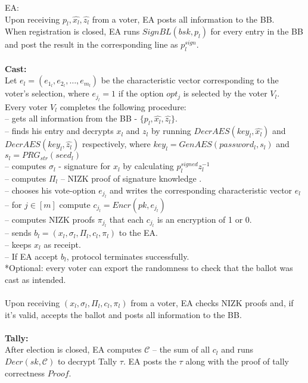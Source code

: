 \documentclass[12pt]{article}
\begin{document}
 EA:\\
Upon receiving $p_l,\hat{x_l},\hat{z_l}$ from a voter, EA posts all information to the BB.\\
When registration is closed, EA runs  $SignBL(bsk, p_l)$ for every entry in the BB and post the result in the corresponding line as $p^{sign}_l$.\\\\
\textbf{Cast:}\\
Let $e_l = (e_{1_l},e_{2_l},\dots,e_{m_l})$ be the characteristic vector corresponding to the voter's selection, where $e_{j_l}=1$ if the option $opt_j$ is selected by the voter $V_l$.\\ 
Every voter $V_l$ completes the following procedure:\\
-- gets all information from the BB - $\{p_l,\hat{x_l},\hat{z_l}\}$.\\
-- finds his entry and decrypts $x_l$ and $z_l$ by running $DecrAES(key_l,\hat{x_l})$ and $DecrAES(key_l,\hat{z_l})$ respectively, where $key_l =  GenAES(password_l, s_l)$ and  $s_l = PRG_{str}(seed_l)$\\
-- computes  $\sigma_l$ - signature for $x_l$  by calculating  $p^{signed}_lz_l^{-1}$\\
-- computes $\Pi_l$ -- NIZK proof of signature knowledge .\\
-- chooses his vote-option $e_{j_l}$ and writes the corresponding characteristic vector $e_l$\\
-- for $j \in [m]$ compute $c_{j_l} =  Encr(pk,e_{j_l})$\\
-- computes NIZK proofs $\pi_{j_l}$ that each $c_{j_l}$ is an encryption of 1 or 0.\\
-- sends $b_l = (x_l, \sigma_l, \Pi_l, c_l, \pi_l)$ to the EA.\\
-- keeps $x_l$ as receipt.\\
-- If EA accept $b_l$, protocol terminates successfully.\\ 
*Optional: every voter can export the randomness to check that the ballot was cast as intended.\\\\
Upon receiving $(x_l, \sigma_l, \Pi_l, c_l, \pi_l)$ from a voter, EA checks NIZK proofs and, if it's valid, accepts the ballot and posts all information to the BB.\\\\
\textbf{Tally: }\\
After election is closed, EA computes $\mathcal{C}$ -- the sum of all $c_l$ and runs $Decr(sk, \mathcal{C})$ to decrypt Tally $\tau$. EA posts the $\tau$ along with the proof of tally correctness $Proof$.\\\\
\end{document}
